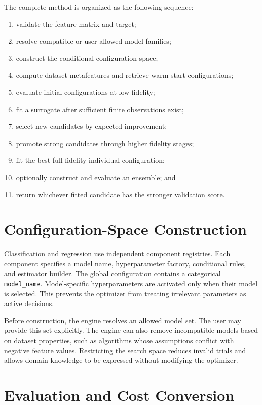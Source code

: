 \documentclass[12pt,a4paper,oneside]{report}
\begin{document}
The complete method is organized as the following sequence:

\begin{enumerate}[leftmargin=*]
  \item validate the feature matrix and target;
  \item resolve compatible or user-allowed model families;
  \item construct the conditional configuration space;
  \item compute dataset metafeatures and retrieve warm-start configurations;
  \item evaluate initial configurations at low fidelity;
  \item fit a surrogate after sufficient finite observations exist;
  \item select new candidates by expected improvement;
  \item promote strong candidates through higher fidelity stages;
  \item fit the best full-fidelity individual configuration;
  \item optionally construct and evaluate an ensemble; and
  \item return whichever fitted candidate has the stronger validation score.
\end{enumerate}

\section{Configuration-Space Construction}

Classification and regression use independent component registries. Each
component specifies a model name, hyperparameter factory, conditional rules,
and estimator builder. The global configuration contains a categorical
\texttt{model\_name}. Model-specific hyperparameters are activated only when
their model is selected. This prevents the optimizer from treating irrelevant
parameters as active decisions.

\medskip

\noindent Before construction, the engine resolves an allowed model set. The user may
provide this set explicitly. The engine can also remove incompatible models
based on dataset properties, such as algorithms whose assumptions conflict
with negative feature values. Restricting the search space reduces invalid
trials and allows domain knowledge to be expressed without modifying the
optimizer.

\section{Evaluation and Cost Conversion}
\end{document}
